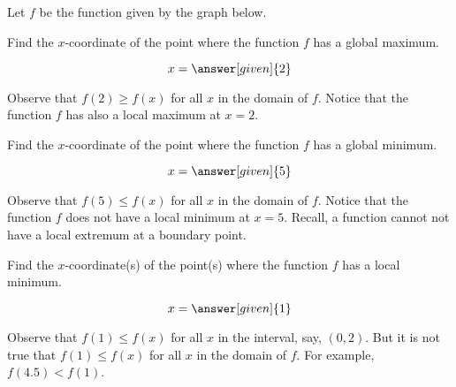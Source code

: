 \documentclass{ximera}
\begin{document}
Let $f$ be the function given by the graph below. 
\begin{image}
\end{image}
\begin{question}
  Find the $x$-coordinate of the point where the function $f$ has a global maximum.
    \begin{prompt}
  \[
 x= \answer[given]{2}
  \]
  \end{prompt}
 
 Observe that $f(2)\ge f(x)$ for all $x$ in the domain of $f$. Notice that the function $f$  has also a local maximum at $x=2$. 
 
 \begin{question}

   Find the $x$-coordinate of the point where the function $f$ has a
   global minimum.
   \begin{prompt}
     \[
     x= \answer[given]{5}
     \]
   \end{prompt}
   Observe that $f(5)\le f(x)$ for all $x$ in the domain of $f$. Notice that the function $f$  does not have a local minimum at $x=5$. 
   Recall, a function cannot not have a local extremum  at a boundary point.
 \end{question}
 \begin{question}
   Find the $x$-coordinate(s) of the point(s) where the function $f$ has a local minimum.
   \begin{prompt}
     \[
     x= \answer[given]{1}
  \]
   \end{prompt}
   Observe that $f(1)\le f(x)$ for all $x$ in the interval, say, $(0,2)$. But it is not true that $f(1)\le f(x)$ for all $x$ in the domain of $f$. For example, $f(4.5)<f(1)$.
 \end{question}
\end{question}
\end{document}
